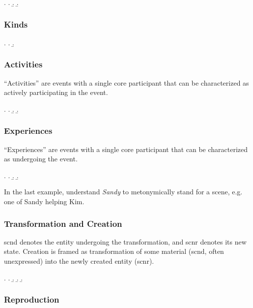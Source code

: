 \documentclass[a4paper]{article}
\begin{document}
\ex. \a. 
     \b. 
     \b. 

\subsubsection{Kinds}

\ex. \a. 
     \b. 

\subsubsection{Activities}

``Activities'' are events with a single core participant that can be
characterized as actively participating in the event.

\ex. \a. 
     \b. 
     \b. 

\subsubsection{Experiences}

``Experiences'' are events with a single core participant that can be
characterized as undergoing the event.

\ex. \a. 
     \b. 
     \b. 

In the last example, understand \emph{Sandy} to metonymically stand for a scene,
e.g. one of Sandy helping Kim.

\subsubsection{Transformation and Creation}

\textsf{scnd} denotes the entity undergoing the transformation, and
\textsf{scnr} denotes its new state. Creation is framed as transformation of
some material (\textsf{scnd}, often unexpressed) into the newly created entity
(\textsf{scnr}).

\ex. \a. 
     \b. 
     \b. 
     \b. 

\subsubsection{Reproduction}
\end{document}
